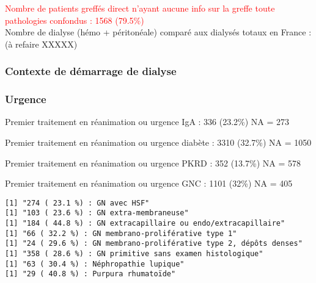 \documentclass[11pt,a4paper]{article}\usepackage[]{graphicx}\usepackage[]{color}
\makeatletter
\newenvironment{kframe}{%
 \def\at@end@of@kframe{}%
 \ifinner\ifhmode%
  \def\at@end@of@kframe{\end{minipage}}%
  \begin{minipage}{\columnwidth}%
 \fi\fi%
 \def\FrameCommand##1{\hskip\@totalleftmargin \hskip-\fboxsep
 \colorbox{shadecolor}{##1}\hskip-\fboxsep
     \hskip-\linewidth \hskip-\@totalleftmargin \hskip\columnwidth}%
 \MakeFramed {\advance\hsize-\width
   \@totalleftmargin\z@ \linewidth\hsize
   \@setminipage}}%
 {\par\unskip\endMakeFramed%
 \at@end@of@kframe}
\newenvironment{knitrout}{}{} %
\makeatother
\begin{document}
\textcolor{red}{Nombre de patients greffés direct n'ayant aucune info sur la greffe toute pathologies confondus : 1568 (79.5\%)}
~\\




Nombre de dialyse (hémo + péritonéale) comparé aux dialysés totaux en France : (à refaire XXXXX)



    \subsubsection{Contexte de démarrage de dialyse}

  \subsubsection*{Urgence}



    
Premier traitement en réanimation ou urgence IgA :  336 (23.2\%) NA = 273

Premier traitement en réanimation ou urgence diabète :  3310 (32.7\%) NA = 1050

Premier traitement en réanimation ou urgence PKRD :  352 (13.7\%) NA = 578

Premier traitement en réanimation ou urgence GNC :  1101 (32\%) NA = 405

\begin{knitrout}
\color{fgcolor}\begin{kframe}
\begin{verbatim}
[1] "274 ( 23.1 %) : GN avec HSF"
[1] "103 ( 23.6 %) : GN extra-membraneuse"
[1] "184 ( 44.8 %) : GN extracapillaire ou endo/extracapillaire"
[1] "66 ( 32.2 %) : GN membrano-proliférative type 1"
[1] "24 ( 29.6 %) : GN membrano-proliférative type 2, dépôts denses"
[1] "358 ( 28.6 %) : GN primitive sans examen histologique"
[1] "63 ( 30.4 %) : Néphropathie lupique"
[1] "29 ( 40.8 %) : Purpura rhumatoïde"
\end{verbatim}
\end{kframe}
\end{knitrout}
\end{document}
